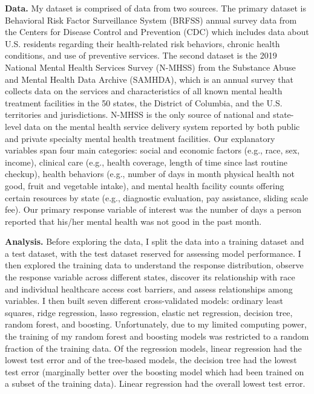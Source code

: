 \documentclass[
]{article}
\begin{document}
\textbf{Data.} My dataset is comprised of data from two sources. The primary dataset is Behavioral Risk Factor Surveillance System (BRFSS) annual survey data from the Centers for Disease Control and Prevention (CDC) which includes data about U.S. residents regarding their health-related risk behaviors, chronic health conditions, and use of preventive services. The second dataset is the 2019 National Mental Health Services Survey (N-MHSS) from the Substance Abuse and Mental Health Data Archive (SAMHDA), which is an annual survey that collects data on the services and characteristics of all known mental health treatment facilities in the 50 states, the District of Columbia, and the U.S. territories and jurisdictions. N-MHSS is the only source of national and state-level data on the mental health service delivery system reported by both public and private specialty mental health treatment facilities. Our explanatory variables span four main categories: social and economic factors (e.g., race, sex, income), clinical care (e.g., health coverage, length of time since last routine checkup), health behaviors (e.g., number of days in month physical health not good, fruit and vegetable intake), and mental health facility counts offering certain resources by state (e.g., diagnostic evaluation, pay assistance, sliding scale fee). Our primary response variable of interest was the number of days a person reported that his/her mental health was not good in the past month.

\textbf{Analysis.} Before exploring the data, I split the data into a training dataset and a test dataset, with the test dataset reserved for assessing model performance. I then explored the training data to understand the response distribution, observe the response variable across different states, discover its relationship with race and individual healthcare access cost barriers, and assess relationships among variables. I then built seven different cross-validated models: ordinary least squares, ridge regression, lasso regression, elastic net regression, decision tree, random forest, and boosting. Unfortunately, due to my limited computing power, the training of my random forest and boosting models was restricted to a random fraction of the training data. Of the regression models, linear regression had the lowest test error and of the tree-based models, the decision tree had the lowest test error (marginally better over the boosting model which had been trained on a subset of the training data). Linear regression had the overall lowest test error.
\end{document}
